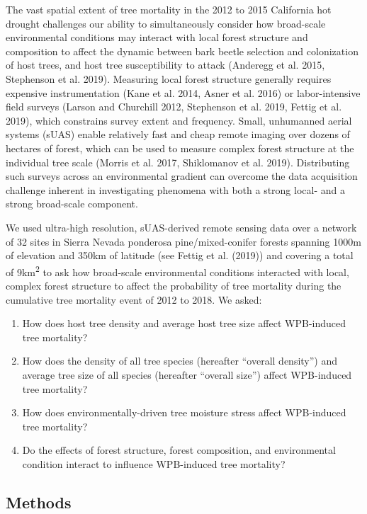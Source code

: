 \documentclass[]{article}
\begin{document}
The vast spatial extent of tree mortality in the 2012 to 2015 California
hot drought challenges our ability to simultaneously consider how
broad-scale environmental conditions may interact with local forest
structure and composition to affect the dynamic between bark beetle
selection and colonization of host trees, and host tree susceptibility
to attack (Anderegg et al. 2015, Stephenson et al. 2019). Measuring
local forest structure generally requires expensive instrumentation
(Kane et al. 2014, Asner et al. 2016) or labor-intensive field surveys
(Larson and Churchill 2012, Stephenson et al. 2019, Fettig et al. 2019),
which constrains survey extent and frequency. Small, unhumanned aerial
systems (sUAS) enable relatively fast and cheap remote imaging over
dozens of hectares of forest, which can be used to measure complex
forest structure at the individual tree scale (Morris et al. 2017,
Shiklomanov et al. 2019). Distributing such surveys across an
environmental gradient can overcome the data acquisition challenge
inherent in investigating phenomena with both a strong local- and a
strong broad-scale component.

We used ultra-high resolution, sUAS-derived remote sensing data over a
network of 32 sites in Sierra Nevada ponderosa pine/mixed-conifer
forests spanning 1000m of elevation and 350km of latitude (see Fettig et
al. (2019)) and covering a total of 9km\textsuperscript{2} to ask how
broad-scale environmental conditions interacted with local, complex
forest structure to affect the probability of tree mortality during the
cumulative tree mortality event of 2012 to 2018. We asked:

\begin{enumerate}
\def\labelenumi{\arabic{enumi}.}
\item
  How does host tree density and average host tree size affect
  WPB-induced tree mortality?
\item
  How does the density of all tree species (hereafter ``overall
  density'') and average tree size of all species (hereafter ``overall
  size'') affect WPB-induced tree mortality?
\item
  How does environmentally-driven tree moisture stress affect
  WPB-induced tree mortality?
\item
  Do the effects of forest structure, forest composition, and
  environmental condition interact to influence WPB-induced tree
  mortality?
\end{enumerate}

\hypertarget{methods}{%
\subsection{Methods}\label{methods}}
\end{document}
